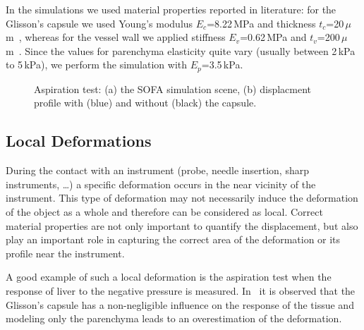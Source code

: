 \documentclass{llncs}
\begin{document}
In the simulations we used material properties reported in literature: for the 
Glisson's capsule we used Young's modulus $E_c$=8.22\,MPa and thickness $t_c$=20\,$\mu$m~\cite{Umale2013},
whereas for the vessel wall we applied stiffness $E_v$=0.62\,MPa and $t_v$=200\,$\mu$m~\cite{Peterlik2012}.
Since the values for parenchyma elasticity quite vary (usually between 2\,kPa to 5\,kPa), we perform the simulation 
with $E_p$=3.5\,kPa.

\begin{figure}[t]
  \caption{\label{fig-aspiration}Aspiration test: (a) the SOFA simulation scene, (b) displacment profile
  with (blue) and without (black) the capsule.}
\end{figure}

\subsection{Local Deformations} %
During the contact with an instrument (probe, needle insertion, sharp
instruments, \ldots) a specific deformation occurs in the near vicinity of
the instrument. This type of deformation may not necessarily induce the
deformation of the object as a whole and therefore can be considered as
local. Correct material properties are not only important to quantify the
displacement, but also play an important role in capturing the correct area of
the deformation or its profile near the instrument.

A good example of such a local deformation is the aspiration test
when the response of liver to the negative pressure is measured.
In~\cite{Hollenstein2006} it is observed that the Glisson's
capsule has a non-negligible influence on the response of the tissue and modeling
only the parenchyma leads to an overestimation of the deformation. 
\end{document}
